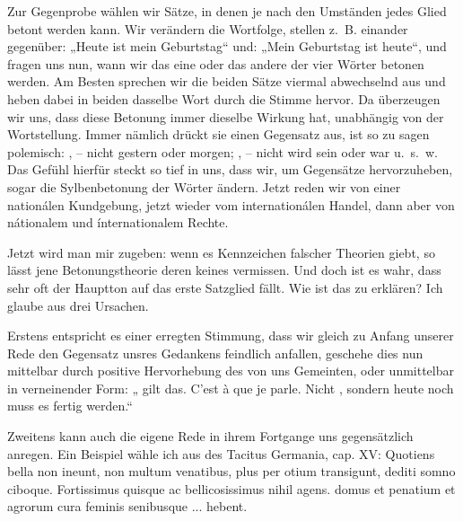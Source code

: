 Zur Gegenprobe wählen wir Sätze, in denen je nach den Umständen jedes Glied betont werden kann. Wir verändern die Wortfolge, stellen z.~B. einander gegenüber: „Heute ist mein Geburtstag“ und: „Mein Geburtstag ist heute“, und fragen uns nun, wann wir das eine oder das andere der vier Wörter betonen werden. Am Besten sprechen wir die beiden Sätze viermal abwechselnd aus und heben dabei in beiden dasselbe Wort durch die Stimme hervor. Da überzeugen wir uns, dass diese Betonung immer dieselbe Wirkung hat, unabhängig von der Wortstellung. Immer nämlich drückt sie einen Gegensatz aus, ist so zu sagen polemisch: , – nicht gestern oder morgen; , – nicht wird sein oder war u.~s.~w. Das Gefühl hierfür steckt so tief in uns, dass wir, um Gegensätze hervorzuheben, sogar die Sylbenbetonung der Wörter ändern. Jetzt reden wir von einer nationálen Kundgebung, jetzt wieder vom internationálen Handel, dann aber von nátionalem und ínternationalem Rechte.

Jetzt wird man mir zugeben: wenn es Kennzeichen falscher Theorien giebt, so lässt jene Betonungstheorie deren keines vermissen. Und doch ist es wahr, dass sehr oft der Hauptton auf das erste Satzglied fällt. Wie ist das zu erklären? Ich glaube aus drei Ursachen.

Erstens entspricht es einer erregten Stimmung, dass wir gleich zu Anfang unserer Rede den Gegensatz unsres Gedankens feindlich anfallen, geschehe dies nun mittelbar durch positive Hervorhebung des von uns Gemeinten, oder unmittelbar in verneinender Form: „ gilt das. C’est à  que je parle. Nicht , sondern heute noch muss es fertig werden.“

Zweitens kann auch die eigene Rede in ihrem Fortgange uns gegensätzlich anregen. Ein Beispiel wähle ich aus des Tacitus Germania, cap. XV: Quotiens bella non ineunt, non multum venatibus, plus per otium transigunt, dediti somno ciboque. Fortissimus quisque ac bellicosissimus nihil agens.  domus et penatium et agrorum cura feminis senibusque ...  hebent.

